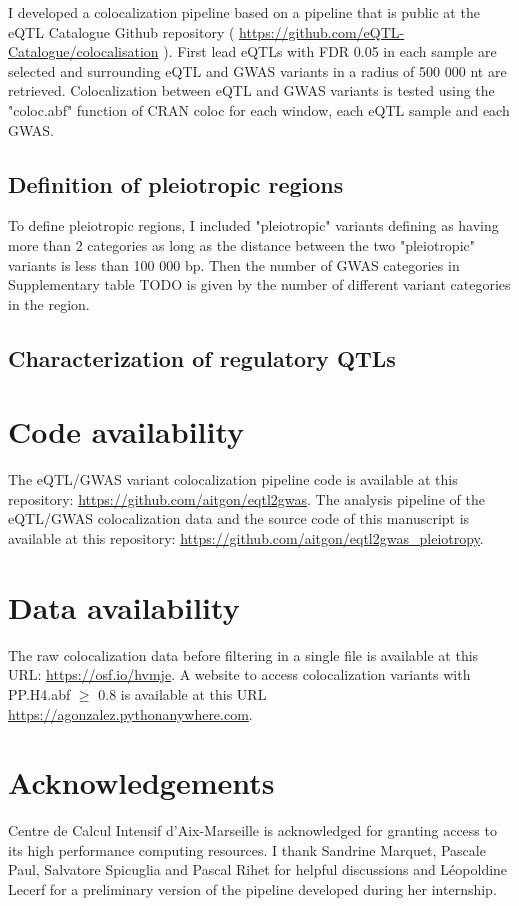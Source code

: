 I developed a colocalization pipeline based on a pipeline that is public at the eQTL Catalogue Github repository ( \url{https://github.com/eQTL-Catalogue/colocalisation} ).
%
First lead eQTLs with FDR 0.05 in each sample are selected and surrounding eQTL and GWAS variants in a radius of 500 000 nt are retrieved.
%
Colocalization between eQTL and GWAS variants is tested using the "coloc.abf" function of CRAN coloc for each window, each eQTL sample and each GWAS.

\subsection*{Definition of pleiotropic regions}

To define pleiotropic regions, I included "pleiotropic" variants defining as having more than 2 categories as long as the distance between the two "pleiotropic" variants is less than 100 000 bp.
%
Then the number of GWAS categories in Supplementary table TODO is given by the number of different variant categories in the region.

\subsection*{Characterization of regulatory QTLs}

\section*{Code availability}

The eQTL/GWAS variant colocalization pipeline code is available at this repository: \url{https://github.com/aitgon/eqtl2gwas}.
%
The analysis pipeline of the eQTL/GWAS colocalization data and the source code of this manuscript is available at this repository: \url{https://github.com/aitgon/eqtl2gwas_pleiotropy}.

\section*{Data availability}

The raw colocalization data before filtering in a single file is available at this URL: \url{https://osf.io/hvmje}.
%
A website to access colocalization variants with PP.H4.abf $\geq$ 0.8 is available at this URL \url{https://agonzalez.pythonanywhere.com}.

\section*{Acknowledgements}

Centre de Calcul Intensif d'Aix-Marseille is acknowledged for granting access to its high performance computing resources.
%
I thank Sandrine Marquet, Pascale Paul, Salvatore Spicuglia and Pascal Rihet for helpful discussions and L\'eopoldine Lecerf for a preliminary version of the pipeline developed during her internship.


